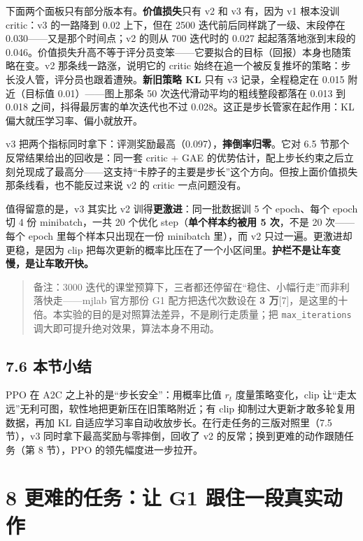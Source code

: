 \documentclass[
  chinese,
]{ctexart}
\begin{document}
下面两个面板只有部分版本有。\textbf{价值损失}只有 v2 和 v3 有，因为 v1
根本没训 critic：v3 的一路降到 0.02 上下，但在 2500
迭代前后同样跳了一级、末段停在 0.030------又是那个时间点；v2 的则从 700
迭代时的 0.027 起起落落地涨到末段的
0.046。价值损失升高不等于评分员变笨------它要拟合的目标（回报）本身也随策略在变。v2
那条线一路涨，说明它的 critic
始终在追一个被反复推坏的策略：步长没人管，评分员也跟着遭殃。\textbf{新旧策略
KL} 只有 v3 记录，全程稳定在 0.015 附近（目标值 0.01）------图上那条 50
次迭代滑动平均的粗线整段都落在 0.013 到 0.018
之间，抖得最厉害的单次迭代也不过 0.028。这正是步长管家在起作用：KL
偏大就压学习率、偏小就放开。

v3 把两个指标同时拿下：评测奖励最高（0.097），\textbf{摔倒率归零}。它对
6.5 节那个反常结果给出的回收是：同一套 critic + GAE
的优势估计，配上步长约束之后立刻兑现成了最高分------这支持``卡脖子的主要是步长''这个方向。但按上面价值损失那条线看，也不能反过来说
v2 的 critic 一点问题没有。

值得留意的是，v3 其实比 v2 训得\textbf{更激进}：同一批数据训 5 个
epoch、每个 epoch 切 4 份 minibatch，一共 20 个优化
step（\textbf{单个样本约被用 5 次}，不是 20 次------每个 epoch
里每个样本只出现在一份 minibatch 里），而 v2
只过一遍。更激进却更稳，是因为 clip
把每次更新的概率比压在了一个小区间里。\textbf{护栏不是让车变慢，是让车敢开快。}

\begin{quote}
备注：3000
迭代的课堂预算下，三者都还停留在``稳住、小幅行走''而非利落快走------mjlab
官方那份 G1 配方把迭代次数设在 \textbf{3
万}{[}7{]}，是这里的十倍。本实验的目的是对照算法差异，不是刷行走质量；把
\texttt{max\_iterations} 调大即可提升绝对效果，算法本身不用动。
\end{quote}

\subsection{7.6 本节小结}\label{ux672cux8282ux5c0fux7ed3-4}

PPO 在 A2C 之上补的是``步长安全''：用概率比值 \(r_t\) 度量策略变化，clip
让``走太远''无利可图，软性地把更新压在旧策略附近；有 clip
抑制过大更新才敢多轮复用数据，再加 KL
自适应学习率自动收放步长。在行走任务的三版对照里（7.5 节），v3
同时拿下最高奖励与零摔倒，回收了 v2 的反常；换到更难的动作跟随任务（第 8
节），PPO 的领先幅度进一步拉开。

\section{8 更难的任务：让 G1
跟住一段真实动作}\label{ux66f4ux96beux7684ux4efbux52a1ux8ba9-g1-ux8ddfux4f4fux4e00ux6bb5ux771fux5b9eux52a8ux4f5c}
\end{document}
